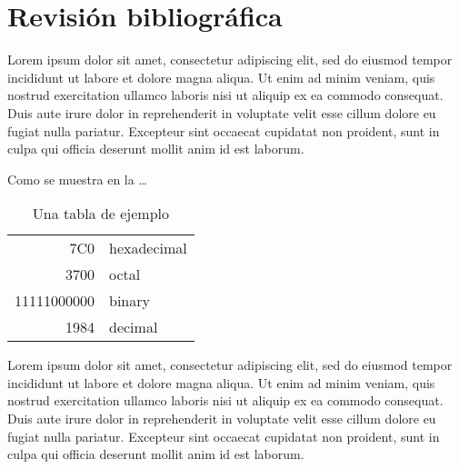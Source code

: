 
\chapter{Revisión bibliográfica}
\label{cha:revision_bibliografica}

\ifpdf
    \graphicspath{{2_revision_bibliografica/figures/PNG/}{2_revision_bibliografica/figures/PDF/}{2_revision_bibliografica/figures/}}
\else
    \graphicspath{{2_revision_bibliografica/figures/EPS/}{2_revision_bibliografica/figures/}}
\fi



Lorem ipsum dolor sit amet, consectetur adipiscing elit, sed do eiusmod tempor incididunt ut labore et dolore magna aliqua. Ut enim ad minim veniam, quis nostrud exercitation ullamco laboris nisi ut aliquip ex ea commodo consequat. Duis aute irure dolor in reprehenderit in voluptate velit esse cillum dolore eu fugiat nulla pariatur. Excepteur sint occaecat cupidatat non proident, sunt in culpa qui officia deserunt mollit anim id est laborum.

Como se muestra en la  \ldots

\begin{table}
\center
\caption{Una tabla de ejemplo}
\begin{tabular}{|r|l|}
  \hline
  7C0 & hexadecimal \\
  3700 & octal \\ \cline{2-2}
  11111000000 & binary \\
  \hline \hline
  1984 & decimal \\
  \hline
\end{tabular}
\label{tab:example}
\end{table}

Lorem ipsum dolor sit amet, consectetur adipiscing elit, sed do eiusmod tempor incididunt ut labore et dolore magna aliqua. Ut enim ad minim veniam, quis nostrud exercitation ullamco laboris nisi ut aliquip ex ea commodo consequat. Duis aute irure dolor in reprehenderit in voluptate velit esse cillum dolore eu fugiat nulla pariatur. Excepteur sint occaecat cupidatat non proident, sunt in culpa qui officia deserunt mollit anim id est laborum.




